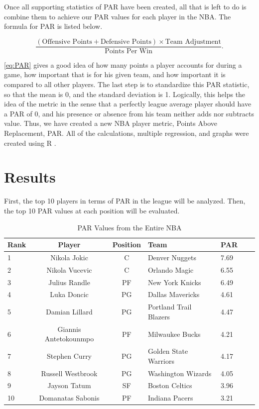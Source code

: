 \documentclass[12pt]{article}
\begin{document}
Once all supporting statistics of PAR have been created, all that is left to 
do is combine them to achieve our PAR values for each player in the 
NBA. The formula for PAR is listed below.

\begin{equation}
 \label{eq:PAR}
  \frac{(\text{Offensive Points} + \text{Defensive Points}) \times \text{Team Adjustment}}
  {\text{Points Per Win}}.
\end{equation}

\ref{eq:PAR} gives a good idea of how many points a player accounts for 
during a 
game, how important that is for 
his given team, and how important it is compared to all other players. The 
last step is to standardize this 
PAR statistic, so that the mean is 0, and the standard deviation is 1. 
Logically, this helps the idea of the 
metric in the sense that a perfectly league average player should have a 
PAR of 0, and his presence or 
absence from his team neither adds nor subtracts value. Thus, we have 
created a new NBA player metric, 
Points Above Replacement, PAR. All of the calculations, multiple regression, and graphs were created using R \citep{R}.
 
 
\section{Results}
First, the top 10 players in terms of PAR in the league will be analyzed. Then, the top 10 PAR values at each position will be evaluated.

\begin{table}[tbp]
  \caption{PAR Values from the Entire NBA}
  \label{tab:NBAtable}
\centering
\begin{tabular}[t]{lccllll}
  \toprule
  Rank & Player & Position & Team & PAR\\
  \midrule
 1 & Nikola Jokic & C & Denver Nuggets & 7.69\\
 2 & Nikola Vucevic & C & Orlando Magic & 6.55\\
 3 & Julius Randle & PF & New York Knicks & 6.49\\
 4 & Luka Doncic & PG & Dallas Mavericks & 4.61\\
 5 & Damian Lillard & PG & Portland Trail Blazers & 4.47\\
 6 & Giannis Antetokounmpo & PF & Milwaukee Bucks & 4.21\\
 7 & Stephen Curry & PG & Golden State Warriors & 4.17\\
 8 & Russell Westbrook & PG & Washington Wizards & 4.05\\
 9 & Jayson Tatum & SF & Boston Celtics & 3.96\\
 10 & Domanatas Sabonis & PF & Indiana Pacers & 3.21\\
 \bottomrule
\end{tabular}
\end{table}
\end{document}
